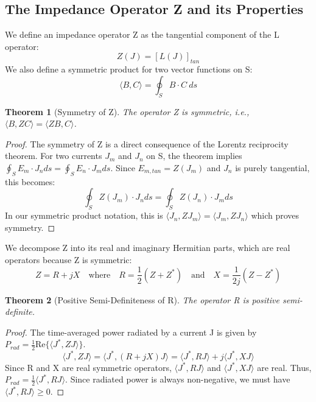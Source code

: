 \documentclass[11pt,a4paper]{article}
\newtheorem{theorem}{Theorem}[section]
\begin{document}
\subsection{The Impedance Operator Z and its Properties}

We define an impedance operator Z as the tangential component of the L operator:
\begin{equation}
    Z(J)=[L(J)]_{tan}
\end{equation}
We also define a symmetric product for two vector functions on S:
\begin{equation}
    \langle B,C\rangle=\oint_{S}B\cdot C~ds
\end{equation}

\begin{theorem}[Symmetry of Z]
The operator Z is symmetric, i.e., \(\langle B,ZC\rangle=\langle ZB,C\rangle\).
\end{theorem}
\begin{proof}
The symmetry of Z is a direct consequence of the Lorentz reciprocity theorem. For two currents \(J_{m}\) and \(J_{n}\) on S, the theorem implies \(\oint_{S}E_{m}\cdot J_{n}ds=\oint_{S}E_{n}\cdot J_{m}ds\). Since \(E_{m,tan}=Z(J_{m})\) and \(J_{n}\) is purely tangential, this becomes:
\begin{equation}
    \oint_{S}Z(J_{m})\cdot J_{n}ds=\oint_{S}Z(J_{n})\cdot J_{m}ds
\end{equation}
In our symmetric product notation, this is \(\langle J_{n},ZJ_{m}\rangle=\langle J_{m},ZJ_{n}\rangle\) which proves symmetry.
\end{proof}

We decompose Z into its real and imaginary Hermitian parts, which are real operators because Z is symmetric:
\begin{equation}
    Z=R+jX \quad \text{where} \quad R=\frac{1}{2}(Z+Z^{*}) \quad \text{and} \quad X=\frac{1}{2j}(Z-Z^{*})
\end{equation}

\begin{theorem}[Positive Semi-Definiteness of R]
The operator R is positive semi-definite.
\end{theorem}
\begin{proof}
The time-averaged power radiated by a current J is given by \(P_{rad}=\frac{1}{2}\text{Re}\{\langle J^{*},ZJ\rangle\}\).
\begin{equation}
    \langle J^{*},ZJ\rangle=\langle J^{*},(R+jX)J\rangle=\langle J^{*},RJ\rangle+j\langle J^{*},XJ\rangle
\end{equation}
Since R and X are real symmetric operators, \(\langle J^{*},RJ\rangle\) and \(\langle J^{*},XJ\rangle\) are real. Thus, \(P_{rad}=\frac{1}{2}\langle J^{*},RJ\rangle\). Since radiated power is always non-negative, we must have \(\langle J^{*},RJ\rangle\ge0\).
\end{proof}
\end{document}
